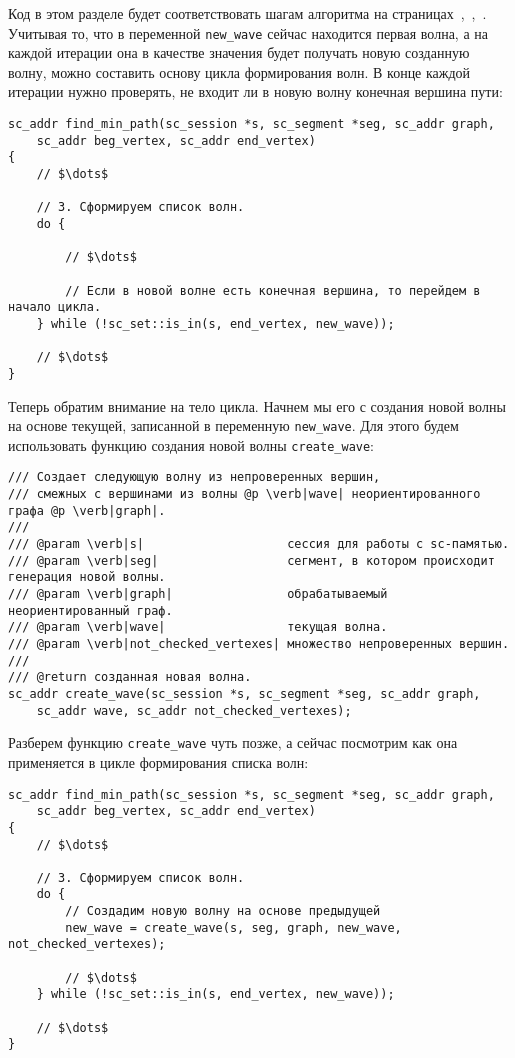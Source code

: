Код в этом разделе будет соответствовать шагам алгоритма на
страницах~\pageref{astep:S4_Create_next_wave},~\pageref{astep:S5_Create_next_wave},~\pageref{astep:S6_Create_last_wave}.
Учитывая то, что в переменной \lstinline|new_wave| сейчас находится
первая волна, а на каждой итерации она в качестве значения будет
получать новую созданную волну, можно составить основу цикла
формирования волн. В конце каждой итерации нужно проверять, не входит
ли в новую волну конечная вершина пути:

\begin{lstlisting}[texcl]
sc_addr find_min_path(sc_session *s, sc_segment *seg, sc_addr graph,
    sc_addr beg_vertex, sc_addr end_vertex)
{
    // $\dots$

    // 3. Сформируем список волн.
    do {

        // $\dots$

        // Если в новой волне есть конечная вершина, то перейдем в начало цикла.
    } while (!sc_set::is_in(s, end_vertex, new_wave));

    // $\dots$
}
\end{lstlisting}

Теперь обратим внимание на тело цикла. Начнем мы его с создания новой
волны на основе текущей, записанной в переменную
\lstinline|new_wave|. Для этого будем использовать функцию создания
новой волны \lstinline|create_wave|:

\begin{lstlisting}[texcl]
/// Создает следующую волну из непроверенных вершин,
/// смежных с вершинами из волны @p \verb|wave| неориентированного графа @p \verb|graph|.
///
/// @param \verb|s|                    сессия для работы с sc-памятью.
/// @param \verb|seg|                  сегмент, в котором происходит генерация новой волны.
/// @param \verb|graph|                обрабатываемый неориентированный граф.
/// @param \verb|wave|                 текущая волна.
/// @param \verb|not_checked_vertexes| множество непроверенных вершин.
///
/// @return созданная новая волна.
sc_addr create_wave(sc_session *s, sc_segment *seg, sc_addr graph,
    sc_addr wave, sc_addr not_checked_vertexes);
\end{lstlisting}

Разберем функцию \lstinline|create_wave| чуть позже, а сейчас
посмотрим как она применяется в цикле формирования списка волн:

\begin{lstlisting}[texcl]
sc_addr find_min_path(sc_session *s, sc_segment *seg, sc_addr graph,
    sc_addr beg_vertex, sc_addr end_vertex)
{
    // $\dots$

    // 3. Сформируем список волн.
    do {
        // Создадим новую волну на основе предыдущей
        new_wave = create_wave(s, seg, graph, new_wave, not_checked_vertexes);

        // $\dots$
    } while (!sc_set::is_in(s, end_vertex, new_wave));

    // $\dots$
}
\end{lstlisting}

